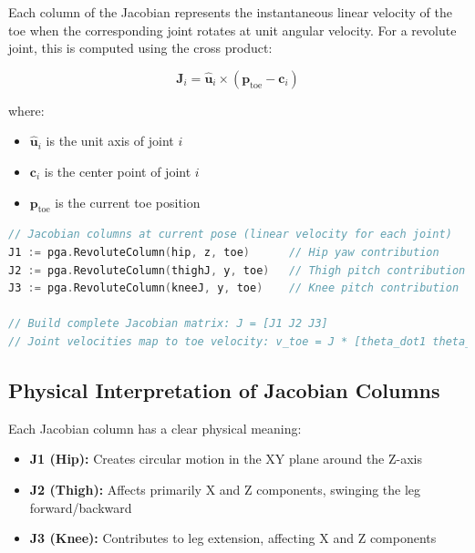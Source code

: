\documentclass[11pt]{article}
\begin{document}
Each column of the Jacobian represents the instantaneous linear velocity of the toe when the corresponding joint rotates at unit angular velocity. For a revolute joint, this is computed using the cross product:

\[\mathbf{J}_i = \hat{\mathbf{u}}_i \times (\mathbf{p}_{\text{toe}} - \mathbf{c}_i)\]

where:
\begin{itemize}
    \item $\hat{\mathbf{u}}_i$ is the unit axis of joint $i$
    \item $\mathbf{c}_i$ is the center point of joint $i$  
    \item $\mathbf{p}_{\text{toe}}$ is the current toe position
\end{itemize}

\begin{lstlisting}[language=Go, caption=Jacobian computation for velocity analysis]
// Jacobian columns at current pose (linear velocity for each joint)
J1 := pga.RevoluteColumn(hip, z, toe)      // Hip yaw contribution
J2 := pga.RevoluteColumn(thighJ, y, toe)   // Thigh pitch contribution  
J3 := pga.RevoluteColumn(kneeJ, y, toe)    // Knee pitch contribution

// Build complete Jacobian matrix: J = [J1 J2 J3]
// Joint velocities map to toe velocity: v_toe = J * [theta_dot1 theta_dot2 theta_dot3]^T
\end{lstlisting}

\subsection{Physical Interpretation of Jacobian Columns}

Each Jacobian column has a clear physical meaning:

\begin{itemize}
    \item \textbf{J1 (Hip):} Creates circular motion in the XY plane around the Z-axis
    \item \textbf{J2 (Thigh):} Affects primarily X and Z components, swinging the leg forward/backward
    \item \textbf{J3 (Knee):} Contributes to leg extension, affecting X and Z components
\end{itemize}
\end{document}
